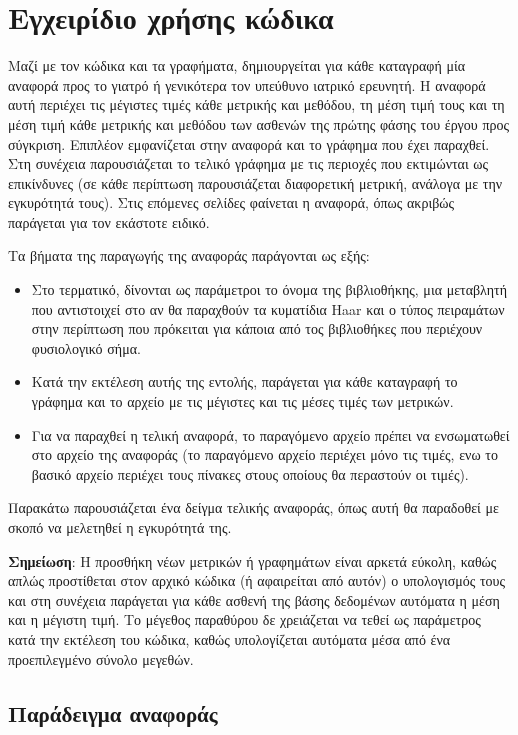 \gr
\chapter{Εγχειρίδιο χρήσης κώδικα}
Μαζί με τον κώδικα και τα γραφήματα, δημιουργείται για κάθε καταγραφή μία αναφορά προς το γιατρό ή γενικότερα τον υπεύθυνο ιατρικό ερευνητή. Η αναφορά αυτή περιέχει τις μέγιστες τιμές κάθε μετρικής και μεθόδου, τη μέση τιμή τους και τη μέση τιμή κάθε μετρικής και μεθόδου των ασθενών της πρώτης φάσης του έργου προς
σύγκριση. Επιπλέον εμφανίζεται στην  αναφορά και το γράφημα που έχει παραχθεί. Στη συνέχεια παρουσιάζεται το τελικό γράφημα με τις περιοχές που εκτιμώνται ως επικίνδυνες (σε κάθε περίπτωση παρουσιάζεται διαφορετική μετρική, ανάλογα με την εγκυρότητά τους). Στις επόμενες σελίδες φαίνεται η αναφορά, όπως ακριβώς παράγεται για τον εκάστοτε ειδικό.
\par
Τα βήματα της παραγωγής της αναφοράς παράγονται ως εξής: 
\begin{itemize}
	\item Στο τερματικό, δίνονται ως παράμετροι το όνομα της βιβλιοθήκης, μια μεταβλητή που αντιστοιχεί στο αν θα παραχθούν τα κυματίδια \en Haar \gr και ο τύπος πειραμάτων στην περίπτωση που πρόκειται για κάποια από τος βιβλιοθήκες που περιέχουν φυσιολογικό σήμα.
	\item Κατά την εκτέλεση αυτής της εντολής, παράγεται για κάθε καταγραφή το γράφημα και το αρχείο με τις μέγιστες και τις μέσες τιμές των μετρικών.
	\item Για να παραχθεί η τελική αναφορά, το παραγόμενο αρχείο πρέπει να ενσωματωθεί στο αρχείο της αναφοράς (το παραγόμενο αρχείο περιέχει μόνο τις τιμές, ενω το βασικό αρχείο περιέχει τους πίνακες στους οποίους θα περαστούν οι τιμές).   
\end{itemize}
Παρακάτω παρουσιάζεται ένα δείγμα τελικής αναφοράς, όπως αυτή θα παραδοθεί με σκοπό να μελετηθεί η εγκυρότητά της. 
\par
\textbf{Σημείωση}: Η προσθήκη νέων μετρικών ή γραφημάτων είναι αρκετά εύκολη, καθώς απλώς προστίθεται στον αρχικό κώδικα (ή αφαιρείται από αυτόν) ο υπολογισμός τους και στη συνέχεια παράγεται για κάθε ασθενή της βάσης δεδομένων αυτόματα η μέση και η μέγιστη τιμή. Το μέγεθος παραθύρου δε χρειάζεται να τεθεί ως παράμετρος κατά την εκτέλεση του κώδικα, καθώς υπολογίζεται αυτόματα μέσα από ένα προεπιλεγμένο σύνολο μεγεθών. 
\section{\gr Παράδειγμα αναφοράς}

